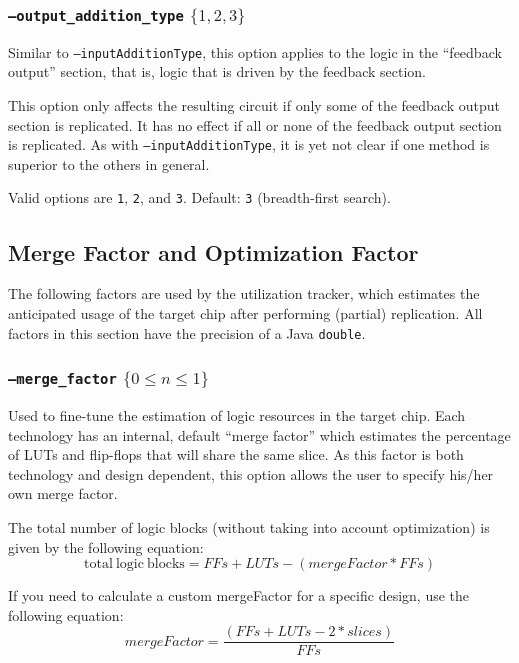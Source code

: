 \subsubsection{\texttt{--output\_addition\_type} $\{1,2,3\}$}
Similar to \texttt{--inputAdditionType}, this option applies to the logic 
in the ``feedback output'' section, that is, logic that is driven by the
feedback section.

This option only affects the resulting circuit if only some of the feedback 
output section is replicated. It has no effect if all or none of the feedback 
output section is replicated. As with \texttt{--inputAdditionType}, it is yet
not clear if one method is superior to the others in general.

Valid options are \texttt{1}, \texttt{2}, and \texttt{3}. Default: \texttt{3} 
(breadth-first search).

\subsection{Merge Factor and Optimization Factor}
The following factors are used by the utilization tracker, which estimates the 
anticipated usage of the target chip after performing (partial) replication\@.
All factors in this section have the precision of a Java \texttt{double}. 

\subsubsection{\texttt{--merge\_factor} $\{ 0 \leq n \leq 1 \}$ }
Used to fine-tune the estimation of logic resources in the target chip. Each 
technology has an internal, default ``merge factor'' which estimates the 
percentage of LUTs and flip-flops that will share the same slice. As this 
factor is both technology and design dependent, this option allows the user to 
specify his/her own merge factor. 

The total number of logic blocks (without taking into account optimization) is 
given by the following equation:
\begin{equation*}
\mathrm{total~logic~blocks} = FFs + LUTs - (mergeFactor * FFs)
\end{equation*}

If you need to calculate a custom mergeFactor for a specific design, use the 
following equation:
\begin{equation*}
mergeFactor = \frac{(FFs + LUTs - 2 * slices)}{FFs}
\end{equation*}

